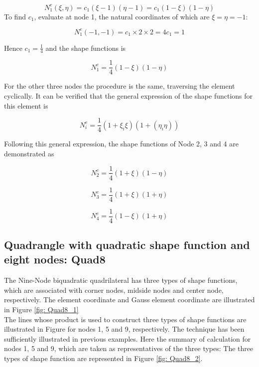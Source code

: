 \documentclass{article}
\begin{document}
\begin{equation}
N_1^e\left(\xi, \eta\right) = c_1 \left( \xi -1 \right) \left( \eta - 1\right) = c_1 \left(1 - \xi\right) \left( 1 - \eta \right)
\end{equation}
To find $c_1$, evaluate at node 1, the natural coordinates of which are $\xi = \eta = -1$:

\begin{equation}
N_1^e \left(-1, -1 \right) = c_1 \times 2 \times 2 = 4c_1 = 1
\end{equation}

Hence $c_1 = \frac{1}{4}$ and the shape functions is

\begin{equation}
N_1^e = \frac{1}{4} \left(1 - \xi\right) \left( 1 - \eta\right)
\end{equation}

For the other three nodes the procedure is the same, traversing the element cyclically. It can be verified that the general expression of the shape functions for this element is 

\begin{equation}
N_i^e = \frac{1}{4} \left( 1 + \xi_i \xi\right) \left(1 + \left(\eta_i \eta\right)\right)
\end{equation}

Following this general expression, the shape functions of Node 2, 3 and 4 are demonstrated as

\begin{equation}
N_2^e = \frac{1}{4} \left(1 + \xi\right) \left( 1 - \eta\right)
\end{equation}

\begin{equation}
N_3^e = \frac{1}{4} \left(1 + \xi\right) \left( 1 + \eta\right)
\end{equation}

\begin{equation}
N_4^e = \frac{1}{4} \left(1 - \xi\right) \left( 1 + \eta\right)
\end{equation}


\subsection{Quadrangle with quadratic shape function and  eight nodes: Quad8}

The Nine-Node biquadratic quadrilateral has three types of shape functions, which are associated with corner nodes, midside nodes and center node, respectively. The element coordinate and Gauss element coordinate are illustrated in Figure \ref{fig: Quad8_1} \\
The lines whose product is used to construct three types of shape functions are illustrated in Figure  for nodes 1, 5 and 9, respectively. The technique has been sufficiently illustrated in previous examples. Here the summary of calculation for nodes 1, 5 and 9, which are taken as representatives of the three types: The three types of shape function are represented in Figure \ref{fig: Quad8_2}.
\end{document}
